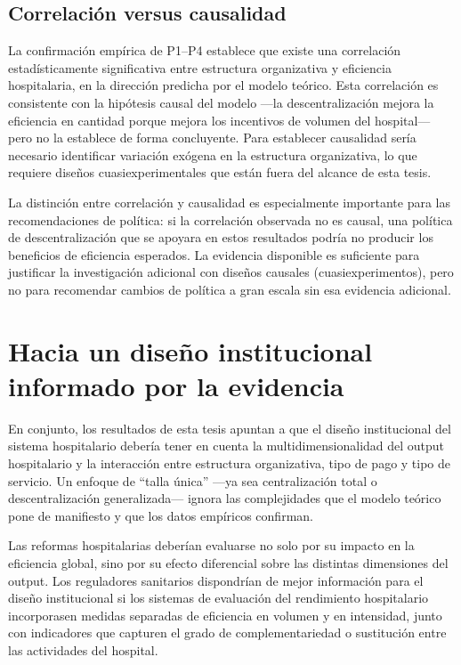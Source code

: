 \subsection{Correlación versus causalidad}

La confirmación empírica de P1--P4 establece que existe una correlación estadísticamente significativa entre estructura organizativa y eficiencia hospitalaria, en la dirección predicha por el modelo teórico. Esta correlación es consistente con la hipótesis causal del modelo ---la descentralización mejora la eficiencia en cantidad porque mejora los incentivos de volumen del hospital--- pero no la establece de forma concluyente. Para establecer causalidad sería necesario identificar variación exógena en la estructura organizativa, lo que requiere diseños cuasiexperimentales que están fuera del alcance de esta tesis.

La distinción entre correlación y causalidad es especialmente importante para las recomendaciones de política: si la correlación observada no es causal, una política de descentralización que se apoyara en estos resultados podría no producir los beneficios de eficiencia esperados. La evidencia disponible es suficiente para justificar la investigación adicional con diseños causales (cuasiexperimentos), pero no para recomendar cambios de política a gran escala sin esa evidencia adicional.

\section{Hacia un diseño institucional informado por la evidencia}

En conjunto, los resultados de esta tesis apuntan a que el diseño institucional del sistema hospitalario debería tener en cuenta la multidimensionalidad del output hospitalario y la interacción entre estructura organizativa, tipo de pago y tipo de servicio. Un enfoque de ``talla única'' ---ya sea centralización total o descentralización generalizada--- ignora las complejidades que el modelo teórico pone de manifiesto y que los datos empíricos confirman.

Las reformas hospitalarias deberían evaluarse no solo por su impacto en la eficiencia global, sino por su efecto diferencial sobre las distintas dimensiones del output. Los reguladores sanitarios dispondrían de mejor información para el diseño institucional si los sistemas de evaluación del rendimiento hospitalario incorporasen medidas separadas de eficiencia en volumen y en intensidad, junto con indicadores que capturen el grado de complementariedad o sustitución entre las actividades del hospital.

